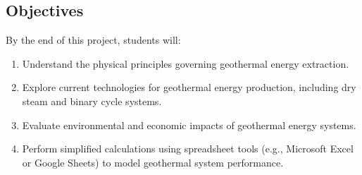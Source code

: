 \documentclass[letterpaper,10pt,english]{jupyterBook}
\begin{document}
\subsection{Objectives}
\label{\detokenize{ProjectSyllabus:id18}}
\sphinxAtStartPar
By the end of this project, students will:
\begin{enumerate}
%
\item {} 
\sphinxAtStartPar
Understand the physical principles governing geothermal energy extraction.

\item {} 
\sphinxAtStartPar
Explore current technologies for geothermal energy production, including dry steam and binary cycle systems.

\item {} 
\sphinxAtStartPar
Evaluate environmental and economic impacts of geothermal energy systems.

\item {} 
\sphinxAtStartPar
Perform simplified calculations using spreadsheet tools (e.g., Microsoft Excel or Google Sheets) to model geothermal system performance.

\end{enumerate}
\end{document}
